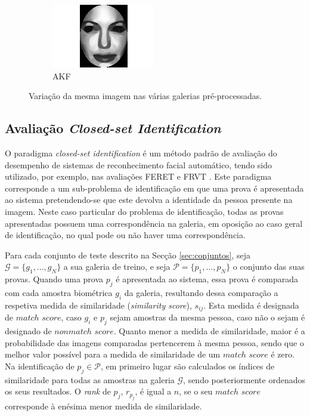 \documentclass{llncs}
\begin{document}
\begin{figure}[t]
\begin{subfigure}[b]{0.2\textwidth}
                \includegraphics[width=\textwidth]{angelina/Angelina_Jolie_0006_akf}
                \caption{AKF}
                \label{fig:akf}
        \end{subfigure}
        \caption{Variação da mesma imagem nas várias galerias pré-processadas.}
        \label{fig:galeriaspreprocessadas}   
\end{figure}

\subsection{Avaliação \textit{Closed-set Identification}} \label{sec:avaliacao1}
O paradigma \textit{closed-set identification} é um método padrão de avaliação do desempenho de sistemas de reconhecimento facial automático, tendo sido utilizado, por exemplo, nas avaliações FERET \cite{Phillips2000} e FRVT \cite{BlackburnDuaneM.;BoneMike;Phillips2001}. Este paradigma corresponde a um sub-problema de identificação em que uma prova é apresentada ao sistema pretendendo-se que este devolva a identidade da pessoa presente na imagem. Neste caso particular do problema de identificação, todas as provas apresentadas possuem uma correspondência na galeria, em oposição ao caso geral de identificação, no qual pode ou não haver uma correspondência.

Para cada conjunto de teste descrito na Secção \ref{sec:conjuntos}, seja $\mathscr{G} = \{g_1, ..., g_N\}$ a sua galeria de treino, e seja $\mathscr{P} = \{p_1, ..., p_N\}$ o conjunto das suas provas. Quando uma prova $p_j$ é apresentada ao sistema, essa prova é comparada com cada amostra biométrica $g_i$ da galeria, resultando dessa comparação a respetiva medida de similaridade (\textit{similarity score}), $s_{ij}$. Esta medida é designada de $match$ $score$, caso $g_i$ e $p_j$ sejam amostras da mesma pessoa, caso não o sejam é designado de $nonmatch$ $score$. Quanto menor a medida de similaridade, maior é a probabilidade das imagens comparadas pertencerem à mesma pessoa, sendo que o melhor valor possível para a medida de similaridade de um $match$ $score$ é zero. Na identificação de $p_j \in \mathscr{P}$, em primeiro lugar são calculados os índices de similaridade para todas as amostras na galeria $\mathscr{G}$, sendo posteriormente ordenados os seus resultados. O \textit{rank} de $p_j$, $r_{p_j}$, é igual a $n$, se o seu $match$ $score$ corresponde à enésima menor medida de similaridade. 
\end{document}
